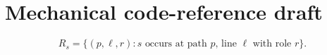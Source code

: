 \documentclass{article}
\begin{document}
\section*{Mechanical code-reference draft}
\label{dataset:init-reference-draft}
\[
R_s=\{(p,\ell,r):s\text{ occurs at path }p\text{, line }\ell\text{ with role }r\}.
\]
\end{document}

